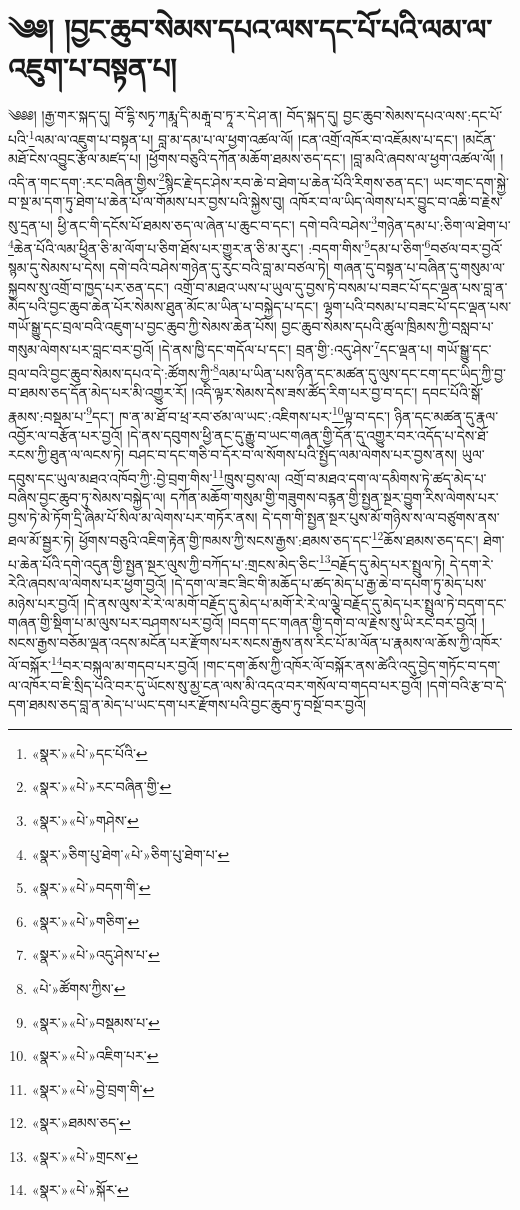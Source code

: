 \chapter{༄༅། །བྱང་ཆུབ་སེམས་དཔའ་ལས་དང་པོ་པའི་ལམ་ལ་འཇུག་པ་བསྟན་པ།}༄༅༅། །རྒྱ་གར་སྐད་དུ། བོ་དྷི་སཏྭ་ཀརྨཱ་དི་མརྒཱ་བ་ཏཱ་ར་དེ་ཤ་ན། བོད་སྐད་དུ། བྱང་ཆུབ་སེམས་དཔའ་ལས་:དང་པོ་པའི་\footnote{«སྣར་»«པེ་»དང་པོའི་}ལམ་ལ་འཇུག་པ་བསྟན་པ། བླ་མ་དམ་པ་ལ་ཕྱག་འཚལ་ལོ། །ངན་འགྲོ་འཁོར་བ་འཇོམས་པ་དང་། །མངོན་མཐོ་ངེས་འབྱུང་རྩོལ་མཛད་པ། །ཕྱོགས་བཅུའི་དཀོན་མཆོག་ཐམས་ཅད་དང་། །བླ་མའི་ཞབས་ལ་ཕྱག་འཚལ་ལོ། །འདི་ན་གང་དག་:རང་བཞིན་གྱིས་\footnote{«སྣར་»«པེ་»རང་བཞིན་གྱི་}སྙིང་རྗེ་དང་ཤེས་རབ་ཆེ་བ་ཐེག་པ་ཆེན་པོའི་རིགས་ཅན་དང་། ཡང་གང་དག་སྐྱེ་བ་སྔ་མ་དག་ཏུ་ཐེག་པ་ཆེན་པོ་ལ་གོམས་པར་བྱས་པའི་སྐྱེས་བུ། འཁོར་བ་ལ་ཡིད་ལེགས་པར་བྱུང་བ་འཆི་བ་རྗེས་སུ་དྲན་པ། ཕྱི་ནང་གི་དངོས་པོ་ཐམས་ཅད་ལ་ཞེན་པ་ཆུང་བ་དང་། དགེ་བའི་བཤེས་\footnote{«སྣར་»«པེ་»གཤེས་}གཉེན་དམ་པ་:ཅིག་ལ་ཐེག་པ་\footnote{«སྣར་»ཅིག་པུ་ཐེག་«པེ་»ཅིག་པུ་ཐེག་པ་}ཆེན་པོའི་ལམ་ཕྱིན་ཅི་མ་ལོག་པ་ཅིག་ཐོས་པར་གྱུར་ན་ཅི་མ་རུང་། :བདག་གིས་\footnote{«སྣར་»«པེ་»བདག་གི་}དམ་པ་ཅིག་\footnote{«སྣར་»«པེ་»གཅིག་}བཙལ་བར་བྱའོ་སྙམ་དུ་སེམས་པ་དེས། དགེ་བའི་བཤེས་གཉེན་དུ་རུང་བའི་བླ་མ་བཙལ་ཏེ། གཞན་དུ་བསྟན་པ་བཞིན་དུ་གསུམ་ལ་སྐྱབས་སུ་འགྲོ་བ་ཁྱད་པར་ཅན་དང་། འགྲོ་བ་མཐའ་ཡས་པ་ཡུལ་དུ་བྱས་ཏེ་བསམ་པ་བཟང་པོ་དང་ལྡན་པས་བླ་ན་མེད་པའི་བྱང་ཆུབ་ཆེན་པོར་སེམས་ཐུན་མོང་མ་ཡིན་པ་བསྐྱེད་པ་དང་། ལྷག་པའི་བསམ་པ་བཟང་པོ་དང་ལྡན་པས་གཡོ་སྒྱུ་དང་བྲལ་བའི་འཇུག་པ་བྱང་ཆུབ་ཀྱི་སེམས་ཆེན་པོས། བྱང་ཆུབ་སེམས་དཔའི་ཚུལ་ཁྲིམས་ཀྱི་བསླབ་པ་གསུམ་ལེགས་པར་བླང་བར་བྱའོ། །དེ་ནས་ཁྱི་དང་གདོལ་པ་དང་། བྲན་གྱི་:འདུ་ཤེས་\footnote{«སྣར་»«པེ་»འདུ་ཤེས་པ་}དང་ལྡན་པ། གཡོ་སྒྱུ་དང་བྲལ་བའི་བྱང་ཆུབ་སེམས་དཔའ་དེ་:ཚོགས་ཀྱི་\footnote{«པེ་»ཚོགས་ཀྱིས་}ལམ་པ་ཡིན་པས་ཉིན་དང་མཚན་དུ་ལུས་དང་ངག་དང་ཡིད་ཀྱི་བྱ་བ་ཐམས་ཅད་དོན་མེད་པར་མི་འགྱུར་རོ། །འདི་ལྟར་སེམས་དེས་ཟས་ཚོད་རིག་པར་བྱ་བ་དང་། དབང་པོའི་སྒོ་རྣམས་:བསྡམ་པ་\footnote{«སྣར་»«པེ་»བསྡམས་པ་}དང་། ཁ་ན་མ་ཐོ་བ་ཕྲ་རབ་ཙམ་ལ་ཡང་:འཇིགས་པར་\footnote{«སྣར་»«པེ་»འཇིག་པར་}ལྟ་བ་དང་། ཉིན་དང་མཚན་དུ་རྣལ་འབྱོར་ལ་བརྩོན་པར་བྱའོ། །དེ་ནས་དབུགས་ཕྱི་ནང་དུ་རྒྱུ་བ་ཡང་གཞན་གྱི་དོན་དུ་འགྱུར་བར་འདོད་པ་དེས་ཐོ་རངས་ཀྱི་ཐུན་ལ་ལངས་ཏེ། བཤང་བ་དང་གཅི་བ་དོར་བ་ལ་སོགས་པའི་སྤྱོད་ལམ་ལེགས་པར་བྱས་ནས། ཡུལ་དབུས་དང་ཡུལ་མཐའ་འཁོབ་ཀྱི་:བྱེ་བྲག་གིས་\footnote{«སྣར་»«པེ་»བྱེ་བྲག་གི་}ཁྲུས་བྱས་ལ། འགྲོ་བ་མཐའ་དག་ལ་དམིགས་ཏེ་ཚད་མེད་པ་བཞིས་བྱང་ཆུབ་ཏུ་སེམས་བསྐྱེད་ལ། དཀོན་མཆོག་གསུམ་གྱི་གཟུགས་བརྙན་གྱི་སྤྱན་སྔར་བྱུག་རིས་ལེགས་པར་བྱས་ཏེ་མེ་ཏོག་དྲི་ཞིམ་པོ་སིལ་མ་ལེགས་པར་གཏོར་ནས། དེ་དག་གི་སྤྱན་སྔར་པུས་མོ་གཉིས་ས་ལ་བཙུགས་ནས་ཐལ་མོ་སྦྱར་ཏེ། ཕྱོགས་བཅུའི་འཇིག་རྟེན་གྱི་ཁམས་ཀྱི་སངས་རྒྱས་:ཐམས་ཅད་དང་\footnote{«སྣར་»ཐམས་ཅད་}ཆོས་ཐམས་ཅད་དང་། ཐེག་པ་ཆེན་པོའི་དགེ་འདུན་གྱི་སྤྱན་སྔར་ལུས་ཀྱི་བཀོད་པ་:གྲངས་མེད་ཅིང་\footnote{«སྣར་»«པེ་»གྲངས་}བརྗོད་དུ་མེད་པར་སྤྲུལ་ཏེ། དེ་དག་རེ་རེའི་ཞབས་ལ་ལེགས་པར་ཕྱག་བྱའོ། །དེ་དག་ལ་ཟང་ཟིང་གི་མཆོད་པ་ཚད་མེད་པ་རྒྱ་ཆེ་བ་དཔག་ཏུ་མེད་པས་མཉེས་པར་བྱའོ། །དེ་ནས་ལུས་རེ་རེ་ལ་མགོ་བརྗོད་དུ་མེད་པ་མགོ་རེ་རེ་ལ་ལྕེ་བརྗོད་དུ་མེད་པར་སྤྲུལ་ཏེ་བདག་དང་གཞན་གྱི་སྡིག་པ་མ་ལུས་པར་བཤགས་པར་བྱའོ། །བདག་དང་གཞན་གྱི་དགེ་བ་ལ་རྗེས་སུ་ཡི་རང་བར་བྱའོ། །སངས་རྒྱས་བཅོམ་ལྡན་འདས་མངོན་པར་རྫོགས་པར་སངས་རྒྱས་ནས་རིང་པོ་མ་ལོན་པ་རྣམས་ལ་ཆོས་ཀྱི་འཁོར་ལོ་བསྐོར་\footnote{«སྣར་»«པེ་»སྐོར་}བར་བསྐུལ་མ་གདབ་པར་བྱའོ། །གང་དག་ཆོས་ཀྱི་འཁོར་ལོ་བསྐོར་ནས་ཚེའི་འདུ་བྱེད་གཏོང་བ་དག་ལ་འཁོར་བ་ཇི་སྲིད་པའི་བར་དུ་ཡོངས་སུ་མྱ་ངན་ལས་མི་འདའ་བར་གསོལ་བ་གདབ་པར་བྱའོ། །དགེ་བའི་རྩ་བ་དེ་དག་ཐམས་ཅད་བླ་ན་མེད་པ་ཡང་དག་པར་རྫོགས་པའི་བྱང་ཆུབ་ཏུ་བསྔོ་བར་བྱའོ། 